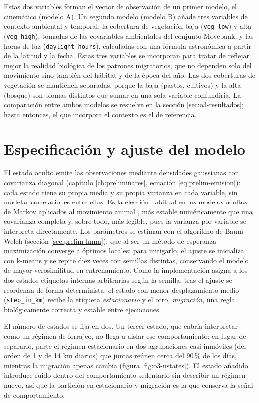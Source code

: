 Estas dos variables forman el vector de observación de un primer modelo, el cinemático
(modelo A). Un segundo modelo (modelo B) añade tres variables de contexto ambiental y
temporal: la cobertura de vegetación baja (\texttt{veg\_low}) y alta
(\texttt{veg\_high}), tomadas de las covariables ambientales del conjunto Movebank, y
las horas de luz (\texttt{daylight\_hours}), calculadas con una fórmula astronómica a
partir de la latitud y la fecha. Estas tres variables se incorporan para tratar de
reflejar mejor la realidad biológica de los patrones migratorios, que no dependen solo
del movimiento sino también del hábitat y de la época del año. Las dos coberturas de
vegetación se mantienen separadas, porque la baja (pastos, cultivos) y la alta (bosque)
son biomas distintos que sumar en una sola variable confundiría. La comparación entre ambos modelos se resuelve en la sección
\ref{sec:o3-resultados}; hasta entonces, el que incorpora el contexto es el de
referencia.

\section{Especificación y ajuste del modelo}
\label{sec:o3-modelo}

El estado oculto emite las observaciones mediante densidades gaussianas con covarianza
diagonal (capítulo \ref{ch:preliminares}, ecuación \ref{eq:prelim-emision}): cada estado
tiene su propia media y su propia varianza en cada variable, sin modelar correlaciones
entre ellas. Es la elección habitual en los modelos ocultos de Markov aplicados al
movimiento animal \cite{patterson2017}, más estable numéricamente que una covarianza
completa y, sobre todo, más legible, pues la varianza por variable se interpreta
directamente. Los parámetros se estiman con el algoritmo de Baum-Welch (sección
\ref{sec:prelim-hmm}), que al ser un método de esperanza-maximización converge a óptimos
locales; para mitigarlo, el ajuste se inicializa con k-means y se repite diez veces con
semillas distintas, conservando el modelo de mayor verosimilitud en entrenamiento. Como
la implementación asigna a los dos estados etiquetas internas arbitrarias según la
semilla, tras el ajuste se reordenan de forma determinista: el estado con menor
desplazamiento medio (\texttt{step\_in\_km}) recibe la etiqueta \emph{estacionario} y el
otro, \emph{migración}, una regla biológicamente correcta y estable entre ejecuciones.

El número de estados se fija en dos. Un tercer estado, que cabría interpretar como un
régimen de forrajeo, no llega a aislar ese comportamiento: en lugar de separarlo, parte
el régimen estacionario en dos agrupaciones casi inmóviles (del orden de 1 y de 14 km
diarios) que juntas reúnen cerca del 90\,\% de los días, mientras la migración apenas
cambia (figura \ref{fig:o3-nstates}). El estado añadido introduce ruido dentro del
comportamiento sedentario sin describir un régimen nuevo, así que la partición en
estacionario y migración es la que conserva la señal de comportamiento.


